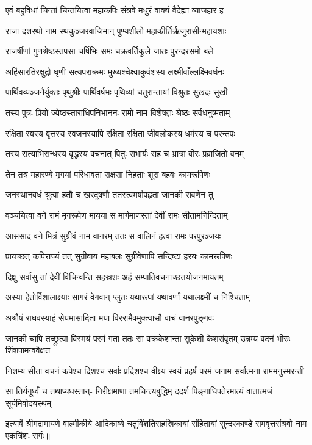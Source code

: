 
\textlink{}
\translink{}

\storymeta


\twolineshloka
{एवं बहुविधां चिन्तां चिन्तयित्वा महाकपिः}
{संश्रवे मधुरं वाक्यं वैदेह्या व्याजहार ह}

\twolineshloka
{राजा दशरथो नाम स्थकुञ्जरवाजिमान्}
{पुण्यशीलो महाकीर्तिर्ऋजुरासीन्महायशाः}

\twolineshloka
{राजर्षीणां गुणश्रेष्ठस्तपसा चर्षिभिः समः}
{चक्रवर्तिकुले जातः पुरन्दरसमो बले}

\twolineshloka
{अहिंसारतिरक्षुद्रो घृणी सत्यपराक्रमः}
{मुख्यश्चेक्ष्वाकुवंशस्य लक्ष्मीवाँल्लक्ष्मिवर्धनः}

\twolineshloka
{पार्थिवव्यञ्जनैर्युक्तः पृथुश्रीः पार्थिवर्षभः}
{पृथिव्यां चतुरान्तायां विश्रुतः सुखदः सुखी}

\twolineshloka
{तस्य पुत्रः प्रियो ज्येष्ठस्ताराधिपनिभाननः}
{रामो नाम विशेषज्ञः श्रेष्ठः सर्वधनुष्मताम्}

\twolineshloka
{रक्षिता स्वस्य वृत्तस्य स्वजनस्यापि रक्षिता}
{रक्षिता जीवलोकस्य धर्मस्य च परन्तपः}

\twolineshloka
{तस्य सत्याभिसन्धस्य वृद्धस्य वचनात् पितुः}
{सभार्यः सह च भ्रात्रा वीरः प्रव्राजितो वनम्}

\twolineshloka
{तेन तत्र महारण्ये मृगयां परिधावता}
{राक्षसा निहताः शूरा बहवः कामरूपिणः}

\twolineshloka
{जनस्थानवधं श्रुत्वा हतौ च खरदूषणौ}
{ततस्त्वमर्षापहृता जानकी रावणेन तु}

\twolineshloka
{वञ्चयित्वा वने रामं मृगरूपेण मायया}
{स मार्गमाणस्तां देवीं रामः सीतामनिन्दिताम्}

\twolineshloka
{आससाद वने मित्रं सुग्रीवं नाम वानरम्}
{ततः स वालिनं हत्वा रामः परपुरञ्जयः}

\twolineshloka
{प्रायच्छत् कपिराज्यं तत् सुग्रीवाय महाबलः}
{सुग्रीवेणापि सन्दिष्टा हरयः कामरूपिणः}

\twolineshloka
{दिक्षु सर्वासु तां देवीं विचिन्वन्ति सहस्रशः}
{अहं सम्पातिवचनाच्छतयोजनमायतम्}

\twolineshloka
{अस्या हेतोर्विशालाक्ष्याः सागरं वेगवान् प्लुतः}
{यथारूपां यथावर्णां यथालक्ष्मीं च निश्चिताम्}

\twolineshloka
{अश्रौषं राघवस्याहं सेयमासादिता मया}
{विररामैवमुक्त्वासौ वाचं वानरपुङ्गवः}

\threelineshloka
{जानकी चापि तच्छ्रुत्वा विस्मयं परमं गता}
{ततः सा वक्रकेशान्ता सुकेशी केशसंवृतम्}
{उन्नम्य वदनं भीरुः शिंशपामन्ववैक्षत}

\fourlineindentedshloka
{निशम्य सीता वचनं कपेश्च}
{दिशश्च सर्वाः प्रदिशश्च वीक्ष्य}
{स्वयं प्रहर्षं परमं जगाम}
{सर्वात्मना राममनुस्मरन्ती}

\fourlineindentedshloka
{सा तिर्यगूर्ध्वं च तथाप्यधस्तान्-}
{निरीक्षमाणा तमचिन्त्यबुद्धिम्}
{ददर्श पिङ्गाधिपतेरमात्यं}
{वातात्मजं सूर्यमिवोदयस्थम्}

इत्यार्षे श्रीमद्रामायणे वाल्मीकीये आदिकाव्ये चतुर्विंशतिसहस्रिकायां संहितायां सुन्दरकाण्डे रामवृत्तसंश्रवो नाम एकत्रिंशः सर्गः॥


\closesection